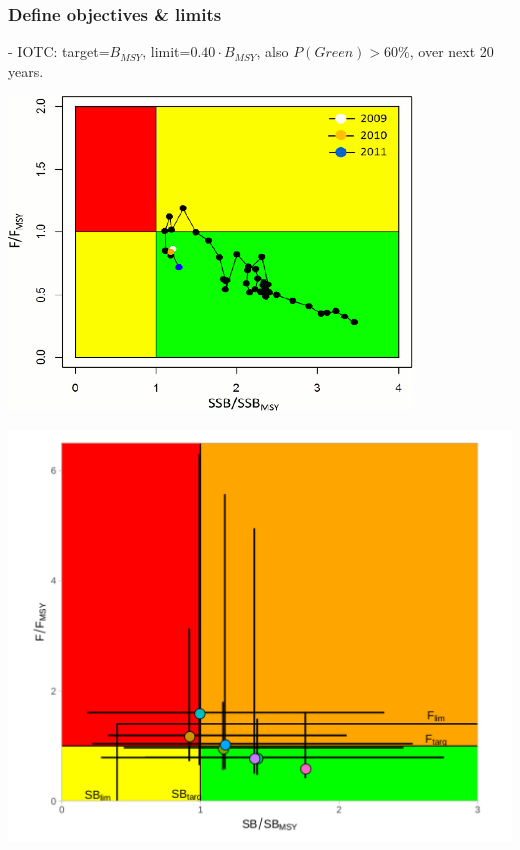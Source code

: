 \documentclass{beamer}\usepackage[]{graphicx}\usepackage[]{xcolor}
\begin{document}
\begin{frame}
\frametitle{Define objectives \& limits}

- IOTC: target=$B_{MSY}$, limit=$0.40\cdot B_{MSY}$, also $P(Green) > 60\%$, over next 20
years.

\begin{center}
\includegraphics[height=0.4\textheight]{figs/kobe.png}
\end{center}

\begin{center}
\includegraphics[height=0.4\textheight]{figs/kobe2.png}
\end{center}

\end{frame}
\end{document}
